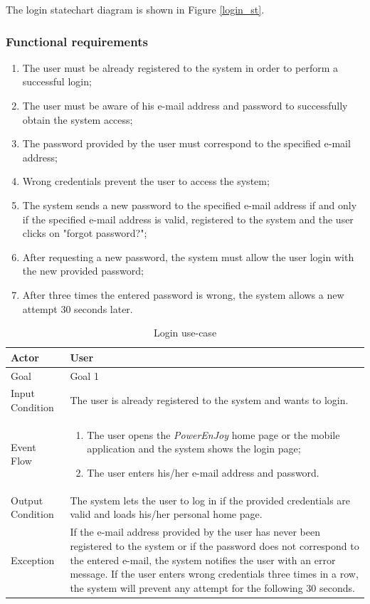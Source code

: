 The login statechart diagram is shown in Figure \ref{login_st}.

\subsubsection{Functional requirements}
\begin{enumerate}
\item The user must be already registered to the system in order to perform a successful login;
\item The user must be aware of his e-mail address and password to successfully obtain the system access;
\item The password provided by the user must correspond to the specified e-mail address;
\item Wrong credentials prevent the user to access the system;
\item The system sends a new password to the specified e-mail address if and only if the specified e-mail address is valid, registered to the system and the user clicks on "forgot password?";
\item After requesting a new password, the system must allow the user login with the new provided password;
\item After three times the entered password is wrong, the system allows a new attempt 30 seconds later.
\end{enumerate}

\begin{table}[H]
\begin{center}
\begin{tabular}{p{} | p{}}
\hline
Actor & User\\
\hline
Goal & Goal 1\\
\hline
Input Condition & The user is already registered to the system and wants to login.\\
\hline
Event Flow & 
\begin{enumerate}
\item The user opens the \emph{PowerEnJoy} home page or the mobile application and the system shows the login page;
\item The user enters his/her e-mail address and password.
\end{enumerate} \\
\hline
Output Condition & The system lets the user to log in if the provided credentials are valid and loads his/her personal home page.\\
\hline
Exception & 
If the e-mail address provided by the user has never been registered to the system or if the password does not correspond to the entered e-mail, the system notifies the user with an error message. If the user enters wrong credentials three times in a row, the system will prevent any attempt for the following 30 seconds.\\
\hline
\end{tabular}
\end{center}
\caption{Login use-case}
\label{login_uc}
\end{table}

